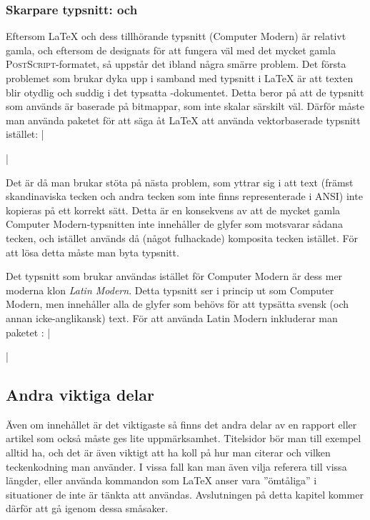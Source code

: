 \documentclass[lang=sv,ptsize=10pt,font=none,nomath,titles=bf,../../a4.tex]{subfiles}
\begin{document}
\subsubsection{Skarpare typsnitt:  och }
\label{sec:2:lmodern}
Eftersom \LaTeX{} och dess tillhörande typsnitt (Computer Modern) är
relativt gamla, och eftersom de designats för att fungera väl med det
mycket gamla \textsc{PostScript}-formatet, så uppstår det ibland några
smärre problem. Det första problemet som brukar dyka upp i samband med
typsnitt i \LaTeX{} är att texten blir otydlig och suddig i det typsatta
\PDF-dokumentet. Detta beror på att de typsnitt som används är baserade
på bitmappar, som inte skalar särskilt väl. Därför måste man använda
paketet  för att säga åt \LaTeX{} att använda vektorbaserade
typsnitt istället:
\latex|\usepackage[T1]{fontenc}|

Det är då man brukar stöta på nästa problem, som yttrar sig i att text
(främst skandinaviska tecken och andra tecken som inte finns 
representerade i \textsc{ANSI}) inte kopieras på ett korrekt sätt. Detta
är en konsekvens av att de mycket gamla Computer Modern-typsnitten inte
innehåller de glyfer som motsvarar sådana tecken, och istället används då
(något fulhackade) komposita tecken istället. För att lösa detta måste man
byta typsnitt.

Det typsnitt som brukar användas istället för Computer Modern är dess
mer moderna klon \emph{Latin Modern}. Detta typsnitt ser
i princip ut som Computer Modern, men innehåller alla de glyfer som behövs
för att typsätta svensk (och annan icke-anglikansk) text. För att använda
Latin Modern inkluderar man paketet :
\latex|\usepackage{lmodern}|

\subsection{Andra viktiga delar}
Även om innehållet är det viktigaste så finns det andra delar av en
rapport eller artikel som också måste ges lite uppmärksamhet.
Titelsidor bör man till exempel alltid ha, och det är även viktigt att ha 
koll på
hur man citerar och vilken teckenkodning man använder. I vissa fall
kan man även vilja referera till vissa längder, eller använda kommandon
som \LaTeX{} anser vara ”ömtåliga” i situationer de inte är tänkta att
användas. Avslutningen på detta kapitel kommer därför att gå igenom dessa
småsaker.
\end{document}
